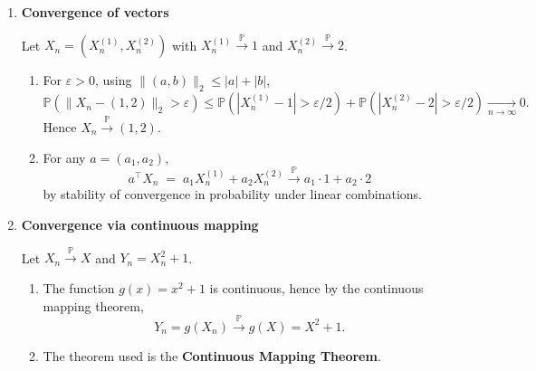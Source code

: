 \documentclass[11pt]{article}
\begin{document}
\begin{enumerate}
Let $\bar X_n=\frac1n\sum_{k=1}^n X_k$, i.i.d., $\mathbb{E}[X_1]=m$, $\mathrm{Var}(X_1)=\sigma^2$.

\begin{enumerate}
\item \emph{Mean and variance.}
By linearity,
\[
\mathbb{E}[\bar X_n]=\frac1n\sum_{k=1}^n \mathbb{E}[X_k]=m.
\]
Independence gives
\[
\mathrm{Var}(\bar X_n)
=
\frac{1}{n^2}\sum_{k=1}^n \mathrm{Var}(X_k)
=
\frac{1}{n^2}\cdot n\sigma^2
=
\frac{\sigma^2}{n}.
\]

\item \emph{Convergence in probability to $m$.}
By Chebyshev, for $\varepsilon>0$,
\[
\mathbb{P}(|\bar X_n-m|\ge \varepsilon)\le \frac{\mathrm{Var}(\bar X_n)}{\varepsilon^2}
=\frac{\sigma^2}{n\varepsilon^2}\xrightarrow[n\to\infty]{}0.
\]
So $\bar X_n\xrightarrow{\mathbb{P}} m$ (weak law of large numbers).
\end{enumerate}

\bigskip

\item \textbf{Convergence of vectors}

Let $X_n=(X_n^{(1)},X_n^{(2)})$ with $X_n^{(1)}\xrightarrow{\mathbb{P}}1$ and $X_n^{(2)}\xrightarrow{\mathbb{P}}2$.

\begin{enumerate}
\item For $\varepsilon>0$, using $\|(a,b)\|_2\le |a|+|b|$,
\[
\mathbb{P}\!\left(\|X_n-(1,2)\|_2>\varepsilon\right)
\le
\mathbb{P}\!\left(|X_n^{(1)}-1|>\varepsilon/2\right)
+
\mathbb{P}\!\left(|X_n^{(2)}-2|>\varepsilon/2\right)
\xrightarrow[n\to\infty]{}0.
\]
Hence $X_n\xrightarrow{\mathbb{P}}(1,2)$.

\item For any $a=(a_1,a_2)$,
\[
a^\top X_n \;=\; a_1 X_n^{(1)}+a_2 X_n^{(2)} \xrightarrow{\mathbb{P}} a_1\cdot 1+a_2\cdot 2
\]
by stability of convergence in probability under linear combinations.
\end{enumerate}

\bigskip

\item \textbf{Convergence via continuous mapping}

Let $X_n\xrightarrow{\mathbb{P}}X$ and $Y_n=X_n^2+1$.

\begin{enumerate}
\item The function $g(x)=x^2+1$ is continuous, hence by the continuous mapping theorem,
\[
Y_n=g(X_n)\xrightarrow{\mathbb{P}} g(X)=X^2+1.
\]

\item The theorem used is the \textbf{Continuous Mapping Theorem}.
\end{enumerate}

\end{enumerate}
\end{document}
